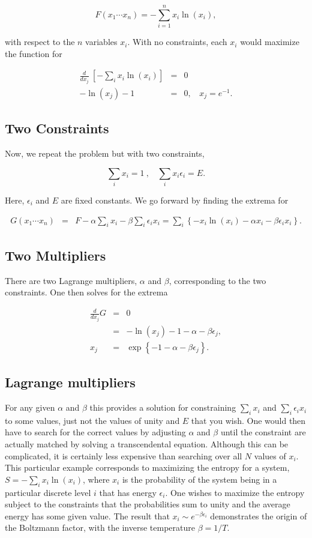\documentclass[%
oneside,                 %
final,                   %
10pt]{article}
\begin{document}
\[
F(x_1\cdots x_n)=-\sum_{i=1}^n x_i\ln(x_i), 
\]

with respect to the $n$ variables $x_i$. With no constraints, each
$x_i$ would maximize the function for

\begin{eqnarray*}
\frac{d}{dx_j}~\left[-\sum_i x_i\ln(x_i)\right]&=&0\\
-\ln(x_j)-1&=&0,~~~~x_j=e^{-1}.
\end{eqnarray*}

\subsection{Two Constraints}

Now, we repeat the problem but with two constraints,

\[
\sum_ix_i=1~,~~~~\sum_ix_i\epsilon_i=E.
\]

Here, $\epsilon_i$ and $E$ are fixed constants. We go forward by
finding the extrema for

\begin{eqnarray*}
G(x_1\cdots x_n)&=&F-\alpha\sum_i x_i-\beta\sum_i\epsilon_ix_i
=\sum_i \left\{-x_i\ln(x_i)-\alpha x_i-\beta\epsilon_ix_i\right\}.
\end{eqnarray*}

\subsection{Two Multipliers}

There are two Lagrange multipliers, $\alpha$ and $\beta$,
corresponding to the two constraints. One then solves for the extrema

\begin{eqnarray*}
\frac{d}{dx_j}G&=&0\\
&=&-\ln(x_j)-1-\alpha-\beta\epsilon_j,\\
x_j&=&\exp\left\{-1-\alpha-\beta\epsilon_j\right\}.
\end{eqnarray*}

\subsection{Lagrange multipliers}

For any given $\alpha$ and $\beta$ this provides a solution for
constraining $\sum_i x_i$ and $\sum_i\epsilon_ix_i$ to some values,
just not the values of unity and $E$ that you wish. One would then
have to search for the correct values by adjusting $\alpha$ and
$\beta$ until the constraint are actually matched by solving a
transcendental equation. Although this can be complicated, it is
certainly less expensive than searching over all $N$ values of
$x_i$. This particular example corresponds to maximizing the entropy
for a system, $S=-\sum_i x_i\ln(x_i)$, where $x_i$ is the probability
of the system being in a particular discrete level $i$ that has energy
$\epsilon_i$. One wishes to maximize the entropy subject to the
constraints that the probabilities sum to unity and the average energy
has some given value. The result that $x_i\sim e^{-\beta\epsilon_i}$
demonstrates the origin of the Boltzmann factor, with the inverse
temperature $\beta=1/T$.
\end{document}
